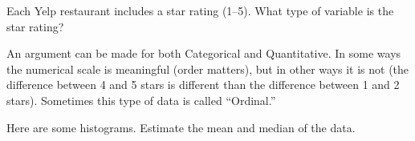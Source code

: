 \documentclass[11pt]{exam}
\begin{document}
\begin{questions}
\question Each Yelp restaurant includes a star rating (1--5).  What type of
variable is the star rating?

\begin{solution}
An argument can be made for both Categorical and Quantitative.  In some ways
the numerical scale is meaningful (order matters), but in other ways it is not
(the difference between 4 and 5 stars is different than the difference between
1 and 2 stars).  Sometimes this type of data is called ``Ordinal.''
\end{solution}




\newpage



\question Here are some histograms.  Estimate the mean and median of the data.

\end{questions}
\end{document}
